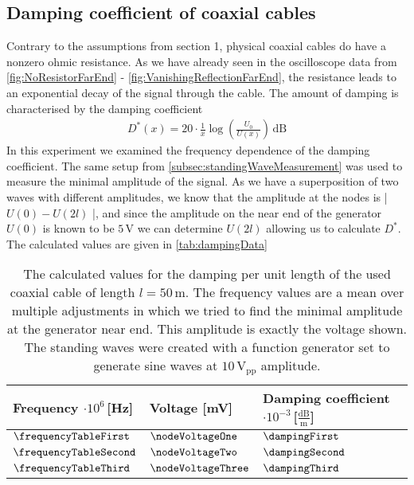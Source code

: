 \documentclass[a4paper,10pt,twocolumn]{article}
\begin{document}
    \subsection{Damping coefficient of coaxial cables}\label{subsec:dampingCoefficient}
    
    Contrary to the assumptions from section 1, physical coaxial cables do have a nonzero ohmic resistance.
    As we have already seen in the oscilloscope data from \autoref{fig:NoResistorFarEnd} - \autoref{fig:VanishingReflectionFarEnd}, the resistance leads to an exponential decay of the signal through the cable.
    The amount of damping is characterised by the damping coefficient
    \begin{align}
       D^*(x) = 20\cdot \frac{1}{x}\log(\frac{U_0}{U(x)})\,\text{dB} 
    \end{align}
    In this experiment we examined the frequency dependence of the damping coefficient.
    The same setup from \autoref{subsec:standingWaveMeasurement} was used to measure the minimal amplitude of the signal.
    As we have a superposition of two waves with different amplitudes, we know that the amplitude at the nodes is | $U(0) - U(2l)$ |, and since the amplitude on the near end of the generator $U(0)$ is known to be $5\,$V
    we can determine $U(2l)$ allowing us to calculate $D^*$.
    The calculated values are given in \autoref{tab:dampingData}
    \begin{table}
        \centering
        \fontsize{7pt}{8pt}\selectfont
        \begin{tabular*}{\linewidth}{@{\extracolsep{\fill}}lll}
    \hline  
    \hline
    \rule[-7pt]{0pt}{23pt}  Frequency $\cdot 10^6\,$[Hz]& Voltage [mV]& Damping coefficient $\cdot 10^{-3}\,$[$\frac{\text{dB}}{\text{m}}$]\\
    \hline
    \rule[-5pt]{0pt}{23pt}  $\frequencyTableFirst$ & $\nodeVoltageOne$& $ \dampingFirst $ \\
    \rule[-5pt]{0pt}{23pt}  $\frequencyTableSecond $ & $\nodeVoltageTwo$ & $ \dampingSecond $ \\
    \rule[-5pt]{0pt}{23pt}  $\frequencyTableThird$ &$\nodeVoltageThree$ & $\dampingThird $ \\
    \hline
    \hline   
        \end{tabular*}
        \caption[]{The calculated values for the damping per unit length of the used coaxial cable of length $l=50\,$m.
        The frequency values are a mean over multiple adjustments in which we tried to find the minimal amplitude at the generator near end.
        This amplitude is exactly the voltage shown.
        The standing waves were created with a function generator set to generate sine waves at $10\,\text{V}_{\text{pp}}$ amplitude.}
        \label{tab:dampingData}
    \end{table}
\end{document}
